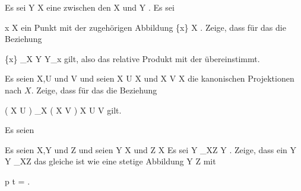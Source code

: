 {}
{

Es sei
 { Y } { X
} {}
eine
zwischen den
\mathkor {} {X} {und} {Y} {.}
Es sei

\mavergleichskette
{\vergleichskette
{ x
}
{ \in }{ X
}
{  }{
}
{    }{
}
{   }{
}
}
{}{}{}
ein Punkt mit der zugehörigen Abbildung
\maabbdisp {\iota} {\{x\}} { X
} {.}
Zeige, dass für das
die Beziehung

\mavergleichskettedisp
{\vergleichskette
{ \{x\}  \times_X Y
}
{ \cong} { Y_x
}
{ } {
}
{ } {
}
{ } {
}
}
{}{}{}
gilt, also das relative Produkt mit der
übereinstimmt.

}
{} {}

{}
{

Es seien
\mathkor {} {X,U} {und} {V} {}
und seien
 {X \times U} {X
} {}
und
 {X \times V} {X
} {}
die kanonischen Projektionen nach $X$. Zeige, dass für das
die Beziehung

\mavergleichskettedisp
{\vergleichskette
{ \left(  X \times U  \right) \times_X \left(  X \times V  \right)
}
{ \cong} { X \times U \times V
}
{ } {
}
{ } {
}
{ } {
}
}
{}{}{}
gilt.

}
{} {}

{}
{

Es seien
 {\R} {\R
} {}

}
{} {}

{}
{

Es seien
\mathkor {} {X,Y} {und} {Z} {}
und seien
\maabb {\varphi} { Y } { X
} {}
und
 { Z } { X
} {}
Es sei
 {Y \times_XZ } { Y
} {.}
Zeige, dass ein
 { Y } { Y \times_XZ
} {}
das gleiche ist wie eine stetige Abbildung
 { Y } { Z
} {}
mit

\mavergleichskette
{\vergleichskette
{ p \circ t
}
{ = }{ \varphi
}
{  }{
}
{    }{
}
{   }{
}
}
{}{}{.}

}
{} {}


